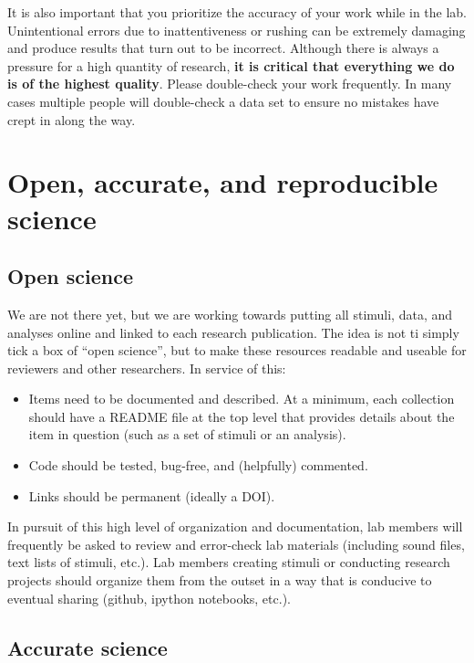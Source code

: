 \documentclass[letterpaper,12pt,oneside]{memoir}
\begin{document}
It is also important that you prioritize the accuracy of your work while in the lab. Unintentional errors due to inattentiveness or rushing can be extremely damaging and produce results that turn out to be incorrect. Although there is always a pressure for a high quantity of research, \textbf{it is critical that everything we do is of the highest quality}. Please double-check your work frequently. In many cases multiple people will double-check a data set to ensure no mistakes have crept in along the way.


\section{Open, accurate, and reproducible science}
\label{sec:openscience}

\subsection{Open science}

We are not there yet, but we are working towards putting all stimuli, data, and analyses online and linked to each research publication. The idea is not ti simply tick a box of ``open science'', but to make these resources readable and useable for reviewers and other researchers. In service of this:

\begin{itemize}
\item Items need to be documented and described. At a minimum, each collection should have a README file at the top level that provides details about the item in question (such as a set of stimuli or an analysis).
\item Code should be tested, bug-free, and (helpfully) commented.
\item Links should be permanent (ideally a DOI).
\end{itemize}

In pursuit of this high level of organization and documentation, lab members will frequently be asked to review and error-check lab materials (including sound files, text lists of stimuli, etc.). Lab members creating stimuli or conducting research projects should organize them from the outset in a way that is conducive to eventual sharing (github, ipython notebooks, etc.).


\subsection{Accurate science}
\end{document}
